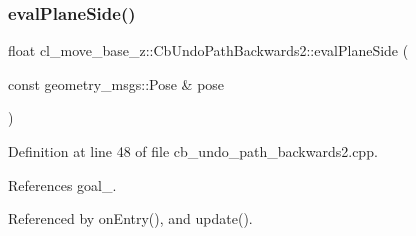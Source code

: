 \subsubsection{\texorpdfstring{eval\+Plane\+Side()}{evalPlaneSide()}}
{\footnotesize\ttfamily float cl\+\_\+move\+\_\+base\+\_\+z\+::\+Cb\+Undo\+Path\+Backwards2\+::eval\+Plane\+Side (\begin{DoxyParamCaption}\item[{const geometry\+\_\+msgs\+::\+Pose \&}]{pose }\end{DoxyParamCaption})\hspace{0.3cm}{\ttfamily [private]}}



Definition at line 48 of file cb\+\_\+undo\+\_\+path\+\_\+backwards2.\+cpp.



References goal\+\_\+.



Referenced by on\+Entry(), and update().


